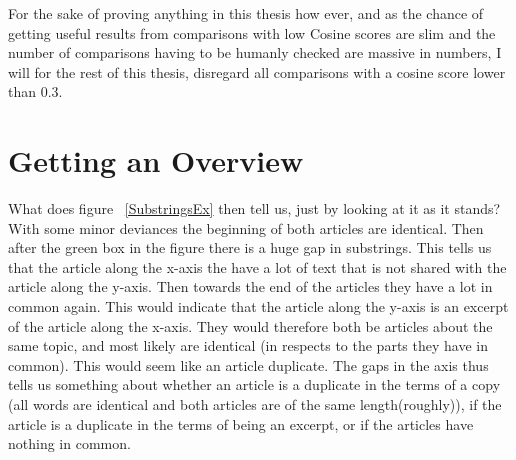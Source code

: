 For the sake of proving anything in this thesis how ever, and as the chance of getting useful results from comparisons with low Cosine scores are slim and the number of comparisons having to be humanly checked are massive in numbers, I will for the rest of this thesis, disregard all comparisons with a cosine score lower than 0.3.

\section{Getting an Overview}

What does figure ~\ref{SubstringsEx} then tell us, just by looking at it as it stands? With some minor deviances the beginning of both articles are identical. Then after the green box in the figure there is a huge gap in substrings. This tells us that the article along the x-axis the have a lot of text that is not shared with the article along the y-axis. Then towards the end of the articles they have a lot in common again. This would indicate that the article along the y-axis is an excerpt of the article along the x-axis. They would therefore both be articles about the same topic, and most likely are identical (in respects to the parts they have in common). This would seem like an article duplicate. The gaps in the axis thus tells us something about whether an article is a duplicate in the terms of a copy (all words are identical and both articles are of the same length(roughly)), if the article is a duplicate in the terms of being an excerpt, or if the articles have nothing in common.
